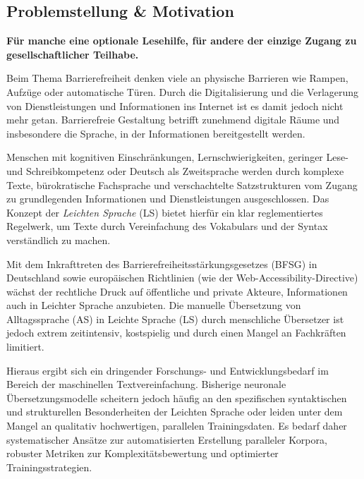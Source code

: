 \subsection{Problemstellung \& Motivation}
\label{sec:problemstellung_motivation}

\begin{tcolorbox}[boxrule=0pt,sharp corners,enhanced,borderline west={2pt}{0pt}{blue}]
    \textbf{Für manche eine optionale Lesehilfe, für andere der einzige Zugang zu gesellschaftlicher Teilhabe.}
\end{tcolorbox}

Beim Thema Barrierefreiheit denken viele an physische Barrieren wie Rampen, Aufzüge oder automatische Türen. Durch die Digitalisierung und die Verlagerung von Dienstleistungen und Informationen ins Internet ist es damit jedoch nicht mehr getan. Barrierefreie Gestaltung betrifft zunehmend digitale Räume und insbesondere die Sprache, in der Informationen bereitgestellt werden.

Menschen mit kognitiven Einschränkungen, Lernschwierigkeiten, geringer Lese- und Schreibkompetenz oder Deutsch als Zweitsprache werden durch komplexe Texte, bürokratische Fachsprache und verschachtelte Satzstrukturen vom Zugang zu grundlegenden Informationen und Dienstleistungen ausgeschlossen. Das Konzept der \textit{Leichten Sprache} (LS) bietet hierfür ein klar reglementiertes Regelwerk, um Texte durch Vereinfachung des Vokabulars und der Syntax verständlich zu machen. 

Mit dem Inkrafttreten des Barrierefreiheitsstärkungsgesetzes (BFSG) in Deutschland sowie europäischen Richtlinien (wie der Web-Accessibility-Directive) wächst der rechtliche Druck auf öffentliche und private Akteure, Informationen auch in Leichter Sprache anzubieten. Die manuelle Übersetzung von Alltagssprache (AS) in Leichte Sprache (LS) durch menschliche Übersetzer ist jedoch extrem zeitintensiv, kostspielig und durch einen Mangel an Fachkräften limitiert.

Hieraus ergibt sich ein dringender Forschungs- und Entwicklungsbedarf im Bereich der maschinellen Textvereinfachung. Bisherige neuronale Übersetzungsmodelle scheitern jedoch häufig an den spezifischen syntaktischen und strukturellen Besonderheiten der Leichten Sprache oder leiden unter dem Mangel an qualitativ hochwertigen, parallelen Trainingsdaten. Es bedarf daher systematischer Ansätze zur automatisierten Erstellung paralleler Korpora, robuster Metriken zur Komplexitätsbewertung und optimierter Trainingsstrategien.

